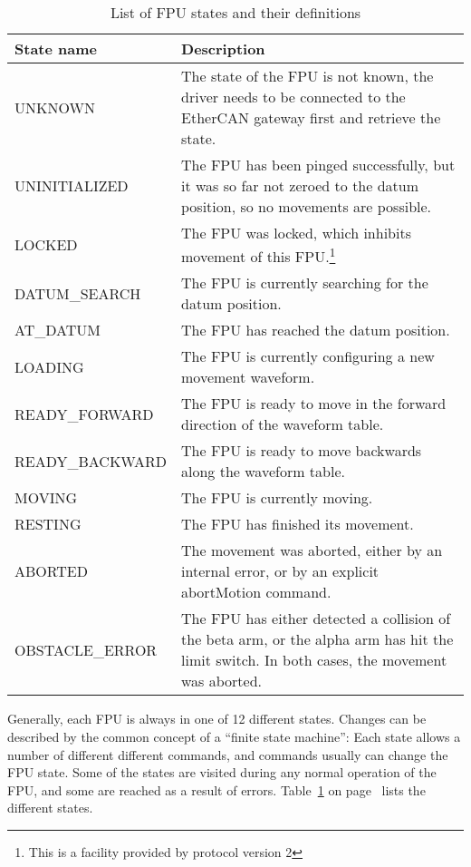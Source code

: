 \documentclass{scrartcl}[12pt,a4paper]
\begin{document}
\begin{table}
  \begin{centering}
\begin{tabular}{|l|p{}|}
  \hline
  \textbf{State name} & \textbf{Description} \\
  \hline 
UNKNOWN & The state of the FPU is not known, the driver needs to
be connected to the EtherCAN gateway first and retrieve the state.\\
\hline
UNINITIALIZED & The FPU has been pinged successfully, but it was
  so far not zeroed to the datum position, so no movements are
  possible.\\
\hline
LOCKED & The FPU was locked, which inhibits movement of this
  FPU.\footnote{This is a facility provided by protocol version 2}\\
\hline
DATUM\_SEARCH & The FPU is currently searching for the datum
position.\\
\hline
AT\_DATUM      & The FPU has reached the datum position.\\
\hline
LOADING & The FPU is currently configuring a new movement waveform.\\
\hline
READY\_FORWARD & The FPU is ready to move in the forward
  direction of the waveform table.\\
\hline
READY\_BACKWARD& The FPU is ready to move backwards along the
  waveform table.\\
\hline
MOVING        & The FPU is currently moving.\\
\hline
RESTING       & The FPU has finished its movement.\\
\hline
ABORTED & The movement was aborted, either by an internal error,
  or by an explicit abortMotion command.\\
\hline
OBSTACLE\_ERROR& The FPU has either detected a collision of the
  beta arm, or the alpha arm has hit the limit switch. In both cases, the
  movement was aborted. \\
\hline
\end{tabular}
\end{centering}
\caption{List of FPU states and their definitions}
\label{tab:fpustates}
\end{table}


Generally, each FPU is always in one of 12 different states.  Changes
can be described by the common concept of a ``finite state machine'':
Each state allows a number of different different commands, and
commands usually can change the FPU state.  Some of the states are
visited during any normal operation of the FPU, and some are reached
as a result of errors.  Table~\ref{tab:fpustates} on
page~\pageref{tab:fpustates} lists the different states.
\end{document}
